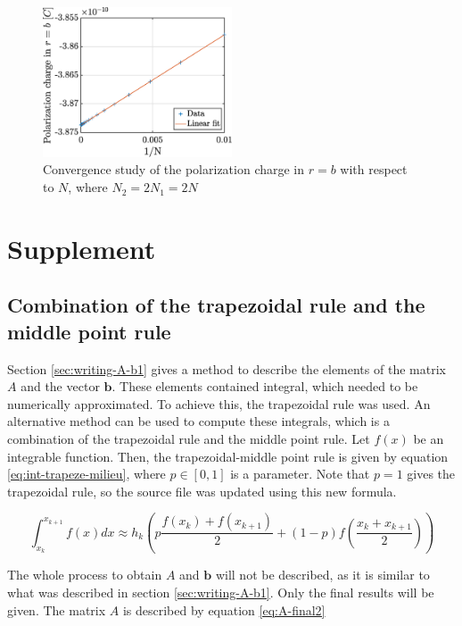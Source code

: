 \documentclass[a4paper,12pt,twoside]{article}
\newcommand{\mbf}[1]{\mathbf{#1}} %
\newcommand{\bracket}[1]{\left(#1\right)}
\begin{document}
  \begin{figure}
    \centering
    \includegraphics[width=0.5\textwidth]{graphs/exdii-conv-polch.eps}
    \caption{Convergence study of the polarization charge in $r=b$ with respect to $N$, where $N_2 = 2N_1 =2N$}
    \label{fig:exdii-conv-polch}
  \end{figure}


  \section{Supplement} %
    \subsection{Combination of the trapezoidal rule and the middle point rule} \label{sec:trapezoidal-middle-rule}
      Section \ref{sec:writing-A-b1} gives a method to describe the elements of the matrix $A$ and the vector $\mbf{b}$.
      These elements contained integral, which needed to be numerically approximated.
      To achieve this, the trapezoidal rule was used.
      An alternative method can be used to compute these integrals, which is a combination of the trapezoidal rule and the middle point rule.
      Let $f\bracket{x}$ be an integrable function.
      Then, the trapezoidal-middle point rule is given by equation \eqref{eq:int-trapeze-milieu}, where $p\in[0,1]$ is a parameter.
      Note that $p=1$ gives the trapezoidal rule, so the source file was updated using this new formula.

      \begin{equation}
        \int_{x_k}^{x_{k+1}}f\bracket{x}dx \approx h_k\bracket{p\frac{f\bracket{x_k} + f\bracket{x_{k+1}}}{2} + \bracket{1-p}f\bracket{\frac{x_k + x_{k+1}}{2}}}
        \label{eq:int-trapeze-milieu}
      \end{equation}

      The whole process to obtain $A$ and $\mbf{b}$ will not be described, as it is similar to what was described in section \ref{sec:writing-A-b1}.
      Only the final results will be given.
      The matrix $A$ is described by equation \eqref{eq:A-final2}%
\end{document}
